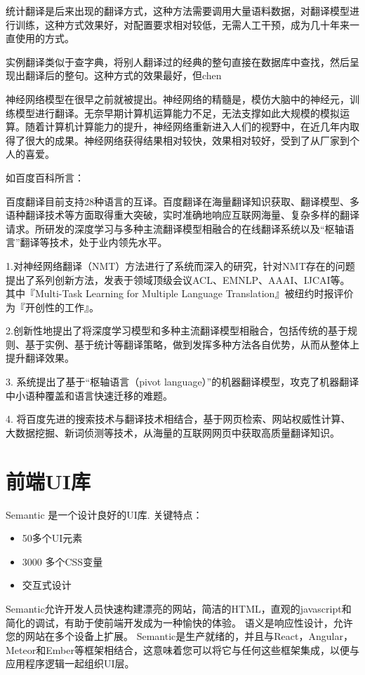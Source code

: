 \documentclass[a4paper, 11pt， oneside]{article}
\begin{document}
    统计翻译是后来出现的翻译方式，这种方法需要调用大量语料数据，对翻译模型进行训练，这种方式效果好，对配置要求相对较低，无需人工干预，成为几十年来一直使用的方式。

    实例翻译类似于查字典，将别人翻译过的经典的整句直接在数据库中查找，然后呈现出翻译后的整句。这种方式的效果最好，但chen

    神经网络模型在很早之前就被提出。神经网络的精髓是，模仿大脑中的神经元，训练模型进行翻译。无奈早期计算机运算能力不足，无法支撑如此大规模的模拟运算。随着计算机计算能力的提升，神经网络重新进入人们的视野中，在近几年内取得了很大的成果。神经网络获得结果相对较快，效果相对较好，受到了从厂家到个人的喜爱。

    如百度百科所言：

    百度翻译目前支持28种语言的互译。百度翻译在海量翻译知识获取、翻译模型、多语种翻译技术等方面取得重大突破，实时准确地响应互联网海量、复杂多样的翻译请求。所研发的深度学习与多种主流翻译模型相融合的在线翻译系统以及“枢轴语言”翻译等技术，处于业内领先水平。

    1.对神经网络翻译（NMT）方法进行了系统而深入的研究，针对NMT存在的问题提出了系列创新方法，发表于领域顶级会议ACL、EMNLP、AAAI、IJCAI等。其中『Multi-Task Learning for Multiple Language Translation』被纽约时报评价为『开创性的工作』。

    2.创新性地提出了将深度学习模型和多种主流翻译模型相融合，包括传统的基于规则、基于实例、基于统计等翻译策略，做到发挥多种方法各自优势，从而从整体上提升翻译效果。

    3. 系统提出了基于“枢轴语言（pivot language）”的机器翻译模型，攻克了机器翻译中小语种覆盖和语言快速迁移的难题。

    4. 将百度先进的搜索技术与翻译技术相结合，基于网页检索、网站权威性计算、大数据挖掘、新词侦测等技术，从海量的互联网网页中获取高质量翻译知识。

\section{前端UI库}
    Semantic 是一个设计良好的UI库.
    关键特点：
    \begin{itemize}
        \item 50多个UI元素
        \item 3000 多个CSS变量
        \item 交互式设计
    \end{itemize}
    Semantic允许开发人员快速构建漂亮的网站，简洁的HTML，直观的javascript和简化的调试，有助于使前端开发成为一种愉快的体验。 语义是响应性设计，允许您的网站在多个设备上扩展。 Semantic是生产就绪的，并且与React，Angular，Meteor和Ember等框架相结合，这意味着您可以将它与任何这些框架集成，以便与应用程序逻辑一起组织UI层。
\end{document}
